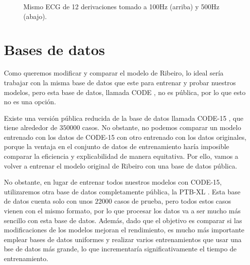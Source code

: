 \begin{figure}
	\setlength{\fboxsep}{0pt}%
	\caption{Mismo \ac{ECG} de 12 derivaciones tomado a 100Hz (arriba) y 500Hz (abajo).}
	\label{fig:ecg12}
\end{figure}

\section{Bases de datos}
Como queremos modificar y comparar el modelo de Ribeiro, lo ideal sería trabajar con la misma base de datos que este para entrenar y probar nuestros modelos, pero esta base de datos, llamada CODE \citep{code}, no es pública, por lo que esto no es una opción.

Existe una versión pública reducida de la base de datos llamada CODE-15 \citep{code15}, que tiene alrededor de $350000$ casos. No obstante, no podemos comparar un modelo entrenado con los datos de CODE-15 con otro entrenado con los datos originales, porque la ventaja en el conjunto de datos de entrenamiento haría imposible comparar la eficiencia y explicabilidad de manera equitativa. Por ello, vamos a volver a entrenar el modelo original de Ribeiro con una base de datos pública.

No obstante, en lugar de entrenar todos nuestros modelos con CODE-15, utilizaremos otra base de datos completamente pública, la PTB-XL \citep{ptbxldb}. Esta base de datos cuenta solo con unos $22000$ casos de prueba, pero todos estos casos vienen con el mismo formato, por lo que procesar los datos va a ser mucho más sencillo con esta base de datos. Además, dado que el objetivo es comparar si las modificaciones de los modelos mejoran el rendimiento, es mucho más importante emplear bases de datos uniformes y realizar varios entrenamientos que usar una bse de datos más grande, lo que incrementaría significativamente el tiempo de entrenamiento.

